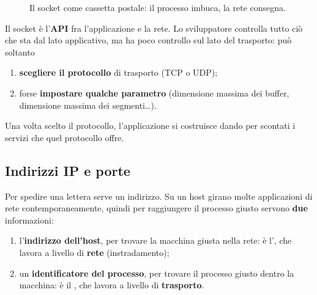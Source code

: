 \begin{figure}[H]
\centering
{}
\caption{Il socket come cassetta postale: il processo imbuca, la rete consegna.}
\end{figure}

Il socket è l'\textbf{API} fra l'applicazione e la rete. Lo sviluppatore
controlla tutto ciò che sta dal lato applicativo, ma ha poco controllo sul lato
del trasporto: può soltanto
\begin{enumerate}
  \item \textbf{scegliere il protocollo} di trasporto (TCP o UDP);
  \item forse \textbf{impostare qualche parametro} (dimensione massima dei
        buffer, dimensione massima dei segmenti\ldots).
\end{enumerate}
Una volta scelto il protocollo, l'applicazione si costruisce dando per scontati
i servizi che quel protocollo offre.

\subsection{Indirizzi IP e porte}

Per spedire una lettera serve un indirizzo. Su un host girano molte
applicazioni di rete contemporaneamente, quindi per raggiungere il processo
giusto servono \textbf{due} informazioni:

\begin{enumerate}
  \item l'\textbf{indirizzo dell'host}, per trovare la macchina giusta nella rete:
        è l', che lavora a livello di \textbf{rete}
        (instradamento);
  \item un \textbf{identificatore del processo}, per trovare il processo giusto
        dentro la macchina: è il , che lavora a livello di
        \textbf{trasporto}.
\end{enumerate}

